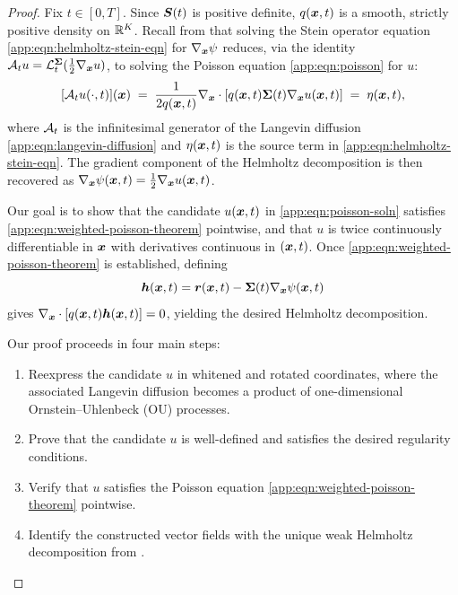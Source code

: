 \begin{proof}
Fix $t \in [0, T]$.
Since $\boldsymbol{S}(t)$ is positive definite, $q(\boldsymbol{x}, t)$ is a smooth, strictly positive density on $\mathbb{R}^K$. 
Recall from  that solving the Stein operator equation \cref{app:eqn:helmholtz-stein-eqn} for $\nabla_{\boldsymbol{x}}\psi$ reduces, via the identity $\mathcal{A}_t u = \mathcal{L}_t^{\boldsymbol{\Sigma}}(\tfrac{1}{2}\nabla_{\boldsymbol{x}} u)$, to solving the Poisson equation \cref{app:eqn:poisson} for $u$:
\begin{equation}\label{app:eqn:weighted-poisson-theorem}
    [\mathcal{A}_t u(\cdot,t)](\boldsymbol{x}) \;=\; \frac{1}{2 q(\boldsymbol{x}, t)} \nabla_{\boldsymbol{x}} \cdot \left[q(\boldsymbol{x}, t)\boldsymbol{\Sigma}(t)\nabla_{\boldsymbol{x}} u(\boldsymbol{x},t)\right] \;=\; \eta(\boldsymbol{x}, t),
\end{equation}
where $\mathcal{A}_t$ is the infinitesimal generator of the Langevin diffusion \cref{app:eqn:langevin-diffusion} and $\eta(\boldsymbol{x}, t)$ is the source term in \cref{app:eqn:helmholtz-stein-eqn}.
The gradient component of the Helmholtz decomposition is then recovered as $\nabla_{\boldsymbol{x}}\psi(\boldsymbol{x}, t) = \tfrac{1}{2}\nabla_{\boldsymbol{x}} u(\boldsymbol{x}, t)$.

Our goal is to show that the candidate $u(\boldsymbol{x}, t)$ in \cref{app:eqn:poisson-soln} satisfies \cref{app:eqn:weighted-poisson-theorem} pointwise, and that $u$ is twice continuously differentiable in $\boldsymbol{x}$ with derivatives continuous in $(\boldsymbol{x}, t)$.
Once \cref{app:eqn:weighted-poisson-theorem} is established, defining
\begin{equation}\label{app:eqn:h-definition-theorem}
    \boldsymbol{h}(\boldsymbol{x},t) = \boldsymbol{r}(\boldsymbol{x},t) - \boldsymbol{\Sigma}(t)\nabla_{\boldsymbol{x}}\psi(\boldsymbol{x},t)
\end{equation}
gives $\nabla_{\boldsymbol{x}} \cdot \left[q(\boldsymbol{x}, t)\boldsymbol{h}(\boldsymbol{x},t)\right] = 0$, yielding the desired Helmholtz decomposition.

Our proof proceeds in four main steps:
\begin{enumerate}[label=(\roman*)]
    \item\label{item:whiten} Reexpress the candidate $u$ in whitened and rotated coordinates, where the associated Langevin diffusion becomes a product of one-dimensional Ornstein--Uhlenbeck (OU) processes.
    \item\label{item:reg} Prove that the candidate $u$ is well-defined and satisfies the desired regularity conditions.
    \item\label{item:poisson} Verify that $u$ satisfies the Poisson equation \cref{app:eqn:weighted-poisson-theorem} pointwise.
    \item\label{item:unique} Identify the constructed vector fields with the unique weak Helmholtz decomposition from .
\end{enumerate}


\end{proof}
